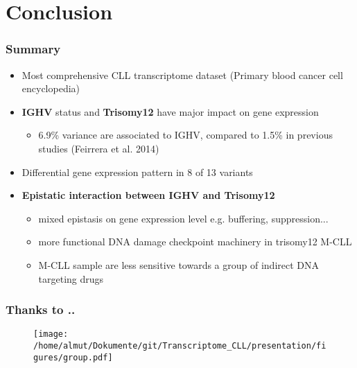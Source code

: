\documentclass[xcolor=dvipsnames,t,10pt]{beamer}
\begin{document}
\section{Conclusion}
%
%
\begin{frame}[c]
	\frametitle{Summary}	
	\begin{itemize}
		\item Most comprehensive CLL transcriptome dataset (Primary blood cancer cell encyclopedia)
		\item \textbf{IGHV} status and \textbf{Trisomy12} have major impact on gene expression
		\begin{itemize}
			\item 6.9\% variance are associated to IGHV, compared to 1.5\% in previous studies (Feirrera et al. 2014)
		\end{itemize}
		\item Differential gene expression pattern in 8 of 13 variants
			\item \textbf{Epistatic interaction between IGHV and Trisomy12}
			\begin{itemize}
				\item mixed epistasis on gene expression level e.g. buffering, suppression...
				\item more functional DNA damage checkpoint machinery in trisomy12 M-CLL
				\item M-CLL sample are less sensitive towards a group of indirect DNA targeting drugs
			\end{itemize}
	\end{itemize}
\end{frame}
%
% 
%
\begin{frame}[c]
	\frametitle{Thanks to ..}
	\begin{figure}
		\centering
		\texttt{[image: /home/almut/Dokumente/git/Transcriptome\_CLL/presentation/figures/group.pdf]}
	\end{figure}
\end{frame}
% 
% 
% 
\appendix
\end{document}
